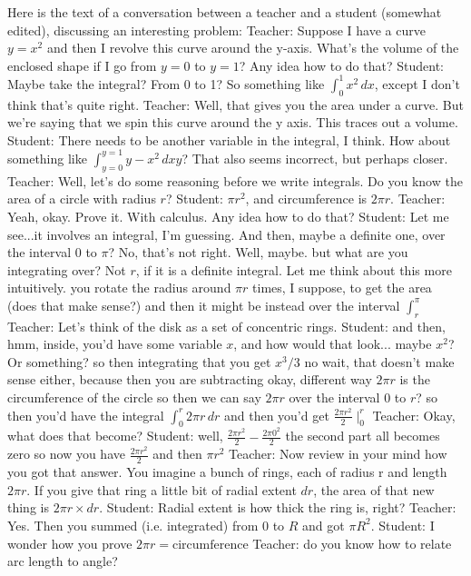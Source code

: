Here is the text of a conversation between a teacher and a student (somewhat edited), discussing an interesting problem:
Teacher: Suppose I have a curve $y = x^2$ and then I revolve this curve around the y-axis. What's the volume of the enclosed shape if I go from $y=0$ to $y=1$? Any idea how to do that?
Student: Maybe take the integral? From 0 to 1? So something like $\int^1_0 x^2 \, dx$, except I don't think that's quite right.
Teacher: Well, that gives you the area under a curve. But we're saying that we spin this curve around the y axis. This traces out a volume.
Student: There needs to be another variable in the integral, I think. How about something like $\int^{y=1}_{y=0} y-x^2 \, dxy$? That also seems incorrect, but perhaps closer.
Teacher: Well, let's do some reasoning before we write integrals. Do you know the area of a circle with radius $r$?
Student: $\pi r^2$, and circumference is $2\pi r$. 
Teacher: Yeah, okay. Prove it. With calculus. Any idea how to do that?
Student: Let me see...it involves an integral, I'm guessing. And then, maybe a definite one, over the interval $0$ to $\pi$? No, that's not right. Well, maybe. but what are you integrating over? Not $r$, if it is a definite integral. Let me think about this more intuitively.
you rotate the radius around $\pi r$ times, I suppose, to get the area (does that make sense?) and then it might be instead over the interval $\int^{\pi}_r$
Teacher: Let's think of the disk as a set of concentric rings.
Student: and then, hmm, inside, you'd have some variable $x$, and how would that look...
maybe $x^2$? Or something?
so then integrating that you get $x^3/3$
no wait, that doesn't make sense either, because then you are subtracting
okay, different way
$2\pi r$ is the circumference of the circle
so then we can say $2\pi r$ over the interval $0$ to $r$?
so then you'd have the integral $\int^r_0 2\pi r \, dr$
and then you'd get $\frac{2\pi r^2}{2}\mid^r_0$
Teacher: Okay, what does that become?
Student: well, $\frac{2\pi r^2}{2}-\frac{2\pi 0^2}{2}$
the second part all becomes zero
so now you have $\frac{2\pi r^2}{2}$
and then $\pi r^2$
Teacher: Now review in your mind how you got that answer. You imagine a bunch of rings, each of radius r and length $2 \pi r$.
If you give that ring a little bit of radial extent $dr$, the area of that new thing is $2 \pi r \times dr$.
Student: Radial extent is how thick the ring is, right?
Teacher: Yes. Then you summed (i.e. integrated) from 0 to $R$ and got $\pi R^2$.
Student: I wonder how you prove $2\pi r = \text{circumference}$
Teacher: do you know how to relate arc length to angle?
